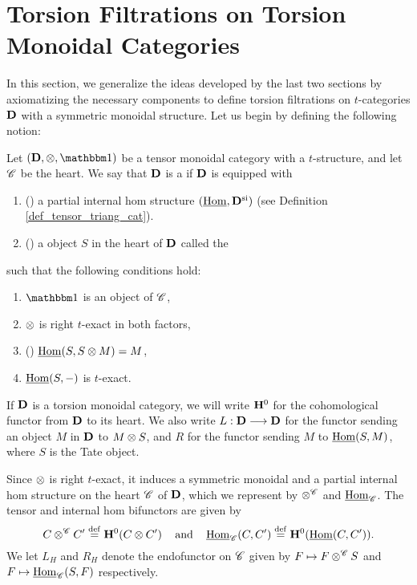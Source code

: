 \newpage
\chapter{Torsion Filtrations on Torsion Monoidal Categories}
\label{sect_filtration_general}

In this section, we generalize the ideas developed by the last
two sections by axiomatizing the necessary components to define
torsion filtrations on $t$-categories $\mathbf{D}$ with a symmetric
monoidal structure. Let us begin by defining the following notion:

\begin{defn}\label{def_torsion_monoidal_category}
Let $(\DCat, \tensor, \Unit)$ be a tensor monoidal category with 
a $t$-structure, and let $\mathscr{C}$ be the heart. We say that 
$\mathbf{D}$ is a  if $\mathbf{D}$ is 
equipped with 
\begin{enumerate}
\item () a partial internal hom
structure $(\underline{\mathrm{Hom}}, \mathbf{D}^{\mathrm{si}})$ (see Definition
\ref{def_tensor_triang_cat}).

\item () a \SemiInvertible object $S$ in the heart
   of $\mathbf{D}$ called the 
\end{enumerate}

\noindent such that the following conditions hold:

\begin{enumerate}
\item $\Unit$ is an object of $\mathscr{C}$,

\item $\otimes$ is right $t$-exact in both factors,

\item () $\underline{\mathrm{Hom}}(S, S \otimes M) = M$,

\item $\underline{\mathrm{Hom}}(S, -)$ is $t$-exact.
\end{enumerate}
\end{defn}

If $\mathbf{D}$ is a torsion monoidal category, we will write $\mathbf{H}^0$
for the cohomological functor from $\mathbf{D}$ to its heart. We also 
write $L: \mathbf{D} \longrightarrow \mathbf{D}$ for the functor sending an object $M$ 
in $\mathbf{D}$ to $M \otimes S$, and $R$ for the functor sending $M$
to $\underline{\mathrm{Hom}}(S, M)$, where $S$ is the Tate object. 

Since $\otimes$ is right $t$-exact, it induces a symmetric 
monoidal and a partial internal hom structure on the heart 
$\mathscr{C}$ of $\mathbf{D}$, which we represent by $\otimes^{\mathscr{C}}$ 
and $\underline{\mathrm{Hom}}_{\mathscr{C}}$. The tensor and internal hom bifunctors
are given by
\[
C \otimes^{\mathscr{C}} C' \stackrel{\mathrm{def}}{=} \mathbf{H}^0(C \otimes C') 
   \;\;\;\textrm{ and }\;\;\;
\underline{\mathrm{Hom}}_{\mathscr{C}}(C, C') \stackrel{\mathrm{def}}{=} \mathbf{H}^0(\underline{\mathrm{Hom}}(C, C')).
\]
We let $L_H$ and $R_H$ denote the endofunctor on 
$\mathscr{C}$ given by $F \mapsto F \otimes^{\mathscr{C}} S$ and $F \mapsto
\underline{\mathrm{Hom}}_{\mathscr{C}}(S, F)$ respectively.

